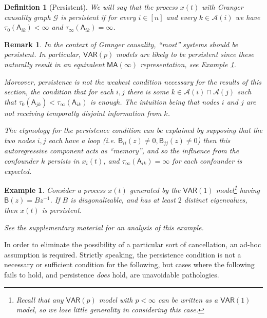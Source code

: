 \documentclass{statsoc}
\def\gcg{\mathcal{G}}  %
\def\VAR{\mathsf{VAR}}  %
\def\B{\mathsf{B}}  %
\def\A{\mathsf{A}}  %
\newcommand{\anc}[1]{\mathcal{A}(#1)}  %
\newtheorem{remark}{Remark}
\newtheorem{definition}{Definition}
\newtheorem{example}{Example}
\begin{document}
\begin{definition}[Persistent]
  We will say that the process $x(t)$ with Granger causality graph
  $\gcg$ is \textit{persistent} if for every $i \in [n]$ and every
  $k \in \anc{i}$ we have $\tau_0(\A_{ik}) < \infty$ and $\tau_\infty(\A_{ik}) = \infty$.
\end{definition}

\begin{remark}
  In the context of Granger causality, ``most'' systems should be
  persistent.  In particular, $\mathsf{\VAR}(p)$ models are likely to
  be persistent since these naturally result in an equivalent
  $\mathsf{MA}(\infty)$ representation, see Example
  \ref{ex:persistent_system}.

  Moreover, persistence is not the weakest condition necessary for the
  results of this section, the condition that for each $i, j$ there is
  some $k \in \anc{i}\cap\anc{j}$ such that
  $\tau_0(\A_{jk}) < \tau_\infty(\A_{ik})$ is enough.  The intuition
  being that nodes $i$ and $j$ are not receiving temporally disjoint
  information from $k$.

  The etymology for the persistence condition can be explained by
  supposing that the two nodes $i, j$ each have a loop (i.e.
  $\B_{ii}(z) \ne 0, \B_{jj}(z) \ne 0$) then this autoregressive
  component acts as ``memory'', and so the influence from the
  confounder $k$ \textit{persists} in $x_i(t)$, and
  $\tau_\infty(\A_{ik}) = \infty$ for each confounder is expected.
\end{remark}

\begin{example}
  \label{ex:persistent_system}
  Consider a process $x(t)$ generated by the $\VAR(1)$
  model\footnote{Recall that any $\VAR(p)$ model with $p < \infty$ can
    be written as a $\VAR(1)$ model, so we lose little generality in
    considering this case.}  having $\B(z) = Bz^{-1}$.  If $B$ is
  diagonalizable, and has at least $2$ distinct eigenvalues, then
  $x(t)$ is persistent.

  See the supplementary material for an analysis of this example.
\end{example}

In order to eliminate the possibility of a particular sort of
cancellation, an ad-hoc assumption is required.  Strictly speaking,
the persistence condition is not a necessary or sufficient condition
for the following, but cases where the following fails to hold, and
persistence \textit{does} hold, are unavoidable pathologies.
\end{document}
